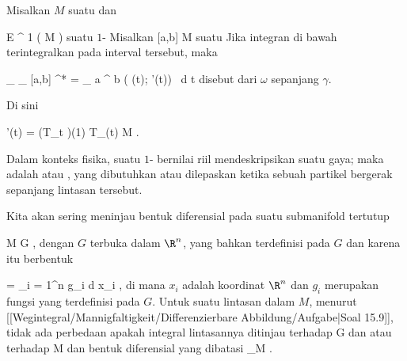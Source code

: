 {}
{

Misalkan $M$ suatu
dan

\mavergleichskette
{\vergleichskette
{ \omega
}
{ \in }{
{ \mathcal E }^{  1 } (  M   )
}
{  }{
}
{    }{
}
{   }{
}
}
{}{}{}
suatu
$1$-
Misalkan
\maabbdisp {\gamma} { [a,b] } { M
} {}
suatu
Jika integran di bawah terintegralkan pada interval tersebut, maka

\mavergleichskettedisp
{\vergleichskette
{ \int_\gamma \omega
}
{ } {
\int_{  [a,b]  }   \gamma^* \omega
}
{ =} { \int_{  a  }^{  b  } \omega ( \gamma(t); \gamma'(t)) \, d  t
}
{ } {
}
{ } {
}
}
{}{}{}
disebut  dari $\omega$ sepanjang $\gamma$.

}
Di sini

\mavergleichskette
{\vergleichskette
{  \gamma'(t)
}
{ = }{ (T_t \gamma)(1)
}
{ \in }{ T_{\gamma (t)} M
}
{    }{
}
{   }{
}
}
{}{}{.}

{}
{

Dalam konteks fisika, suatu
$1$-
bernilai riil
 {} {}
mendeskripsikan suatu gaya; maka
adalah  {} atau  {,} yang dibutuhkan atau dilepaskan ketika sebuah partikel bergerak sepanjang lintasan tersebut.

}

Kita akan sering meninjau bentuk diferensial pada suatu submanifold tertutup

\mavergleichskette
{\vergleichskette
{M
}
{ \subseteq }{G
}
{  }{
}
{    }{
}
{   }{
}
}
{}{}{,}
dengan $G$ terbuka dalam $\R^n$, yang bahkan terdefinisi pada $G$ dan karena itu berbentuk

\mavergleichskette
{\vergleichskette
{ \omega
}
{ = }{ \sum_{i = 1}^n g_i d x_i
}
{  }{
}
{    }{
}
{   }{
}
}
{}{}{,}
di mana $x_i$ adalah koordinat $\R^n$ dan $g_i$ merupakan fungsi yang terdefinisi pada $G$. Untuk suatu lintasan dalam $M$, menurut
[[Wegintegral/Mannigfaltigkeit/Differenzierbare Abbildung/Aufgabe|Soal 15.9]],
tidak ada perbedaan apakah integral lintasannya ditinjau terhadap
\mathkor {} {G} {dan} {\omega} {}
atau terhadap
\mathkor {} {M} {dan bentuk diferensial yang dibatasi} {\omega \vert_M} {.}

